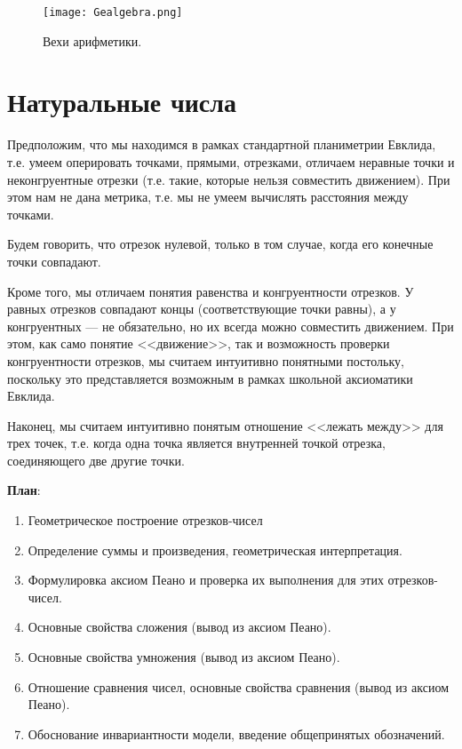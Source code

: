 \begin{figure}[htb!]
\begin{center}
\texttt{[image: Gealgebra.png]}
\end{center}
\caption{Вехи арифметики.}\label{ariphmetics}
\end{figure}





\section{Натуральные числа}


Предположим, что мы находимся в рамках стандартной планиметрии Евклида, т.е. умеем оперировать точками, прямыми, отрезками, отличаем неравные точки и неконгруентные отрезки (т.е. такие, которые нельзя совместить движением). При этом нам не дана метрика, т.е. мы не умеем вычислять расстояния между точками.

Будем говорить, что отрезок нулевой, только в том случае, когда его конечные точки совпадают.

Кроме того, мы отличаем понятия равенства и конгруентности отрезков. У равных отрезков совпадают концы (соответствующие точки равны), а у конгруентных --- не обязательно, но их всегда можно совместить движением. При этом, как само понятие <<движение>>, так и возможность проверки конгруентности отрезков, мы считаем интуитивно понятными постольку, поскольку это представляется возможным в рамках школьной аксиоматики Евклида.

Наконец, мы считаем интуитивно понятым отношение <<лежать между>> для трех точек, т.е. когда одна точка является внутренней точкой отрезка, соединяющего две другие точки.




\textbf{План}:
\begin{enumerate}
\item Геометрическое построение отрезков-чисел
\item Определение суммы и произведения, геометрическая интерпретация.
\item Формулировка аксиом Пеано и проверка их выполнения для этих отрезков-чисел.
\item Основные свойства сложения (вывод из аксиом Пеано).
\item Основные свойства умножения (вывод из аксиом Пеано).
\item Отношение сравнения чисел, основные свойства сравнения (вывод из аксиом Пеано).
\item Обоснование инвариантности модели, введение общепринятых обозначений.
\end{enumerate}


